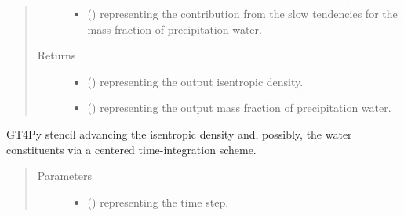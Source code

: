 \documentclass[letterpaper,10pt,english]{sphinxmanual}
\begin{document}
\begin{fulllineitems}
\begin{fulllineitems}
\begin{quote}
\begin{description}
\begin{itemize}
\item {} 
 () \textendash{}  representing the contribution from the slow tendencies for the mass fraction of
precipitation water.

\end{itemize}

\item[{Returns}] \leavevmode
\begin{itemize}
\item {} 
 () \textendash{}  representing the output isentropic density.

\item {} 
 () \textendash{}  representing the output mass fraction of precipitation water.

\end{itemize}


\end{description}\end{quote}

\end{fulllineitems}


\begin{fulllineitems}
\label{\detokenize{api:dycore.prognostic_isentropic_nonconservative_centered.PrognosticIsentropicNonconservativeCentered._stencil_stepping_by_neglecting_vertical_advection_unstaggered_defs}}
GT4Py stencil advancing the isentropic density and, possibly, the water constituents via a centered time-integration scheme.
\begin{quote}\begin{description}
\item[{Parameters}] \leavevmode\begin{itemize}
\item {} 
 () \textendash{}  representing the time step.


\end{itemize}
\end{description}
\end{quote}
\end{fulllineitems}
\end{fulllineitems}
\end{document}

